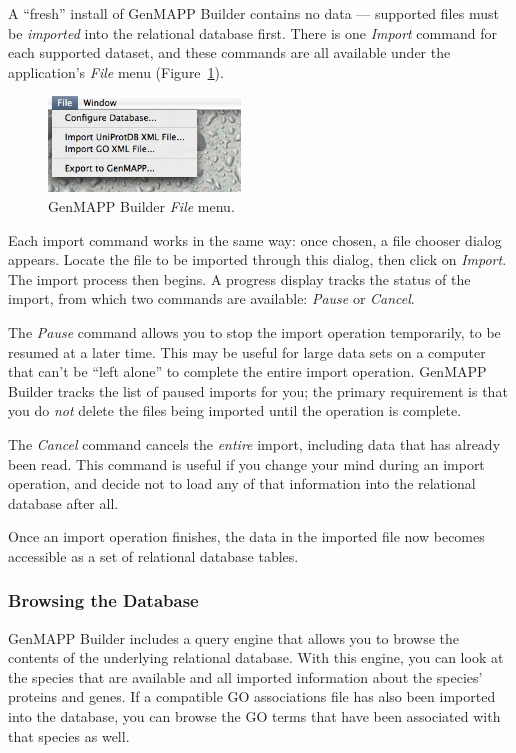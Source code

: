 \documentclass[11pt]{article}
\begin{document}
A ``fresh'' install of GenMAPP Builder contains no data --- supported files must be \emph{imported} into the relational database first.  There is one \textsl{Import} command for each supported dataset, and these commands are all available under the application's \textsl{File} menu (Figure~\ref{fileMenu}).

\begin{figure}[htbp] %
   \centering
   \includegraphics[height=1in]{figures/fileMenu.png} 
   \caption{GenMAPP Builder \textsl{File} menu.}
   \label{fileMenu}
\end{figure}

Each import command works in the same way: once chosen, a file chooser dialog appears.  Locate the file to be imported through this dialog, then click on \textsl{Import}.  The import process then begins.  A progress display tracks the status of the import, from which two commands are available: \textsl{Pause} or \textsl{Cancel}.

The \textsl{Pause} command allows you to stop the import operation temporarily, to be resumed at a later time.  This may be useful for large data sets on a computer that can't be ``left alone'' to complete the entire import operation.  GenMAPP Builder tracks the list of paused imports for you; the primary requirement is that you do \emph{not} delete the files being imported until the operation is complete.

The \textsl{Cancel} command cancels the \emph{entire} import, including data that has already been read.  This command is useful if you change your mind during an import operation, and decide not to load any of that information into the relational database after all.

Once an import operation finishes, the data in the imported file now becomes accessible as a set of relational database tables.

\subsubsection{Browsing the Database}

GenMAPP Builder includes a query engine that allows you to browse the contents of the underlying relational database.  With this engine, you can look at the species that are available and all imported information about the species' proteins and genes.  If a compatible GO associations file has also been imported into the database, you can browse the GO terms that have been associated with that species as well.
\end{document}
